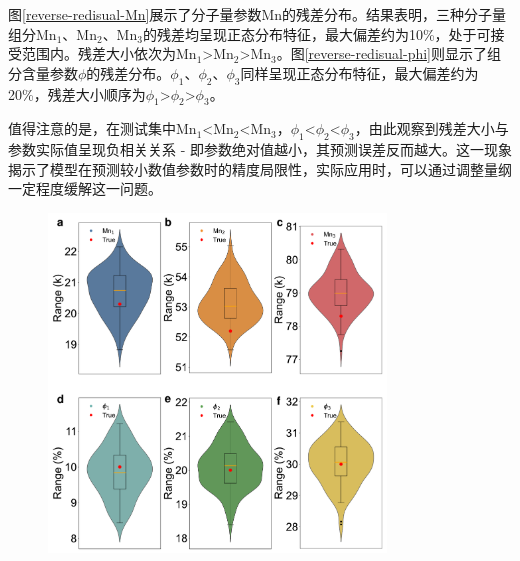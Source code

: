 图\ref{reverse-redisual-Mn}展示了分子量参数Mn的残差分布。结果表明，三种分子量组分Mn$_1$、Mn$_2$、Mn$_3$的残差均呈现正态分布特征，最大偏差约为10\%，处于可接受范围内。残差大小依次为Mn$_1$>Mn$_2$>Mn$_3$。图\ref{reverse-redisual-phi}则显示了组分含量参数$\phi$的残差分布。$\phi_1$、$\phi_2$、$\phi_3$同样呈现正态分布特征，最大偏差约为20\%，残差大小顺序为$\phi_1$>$\phi_2$>$\phi_3$。

值得注意的是，在测试集中Mn$_1$<Mn$_2$<Mn$_3$，$\phi_1$<$\phi_2$<$\phi_3$，由此观察到残差大小与参数实际值呈现负相关关系 - 即参数绝对值越小，其预测误差反而越大。这一现象揭示了模型在预测较小数值参数时的精度局限性，实际应用时，可以通过调整量纲一定程度缓解这一问题。
\begin{figure}[htbp]
  \centering
  \includegraphics[width=0.8\textwidth]{Fig/reverse-violin.pdf}
\end{figure}

